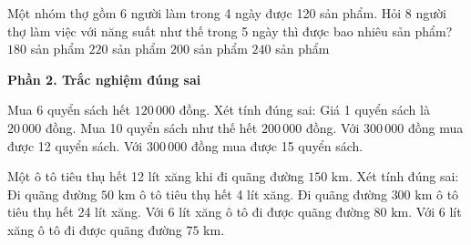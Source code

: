 \begin{ex} %
Một nhóm thợ gồm 6 người làm trong 4 ngày được 120 sản phẩm. Hỏi 8 người thợ làm việc với năng suất như thế trong 5 ngày thì được bao nhiêu sản phẩm?
\choice
{$180$ sản phẩm}
{$220$ sản phẩm}
{\True $200$ sản phẩm}
{$240$ sản phẩm}
\end{ex}

\textbf{Phần 2. Trắc nghiệm đúng sai}

\begin{ex} %
Mua 6 quyển sách hết $120\,000$ đồng. Xét tính đúng sai:
\choiceTF
{\True Giá 1 quyển sách là $20\,000$ đồng.}
{\True Mua 10 quyển sách như thế hết $200\,000$ đồng.}
{Với $300\,000$ đồng mua được 12 quyển sách.}
{\True Với $300\,000$ đồng mua được 15 quyển sách.}
\end{ex}

\begin{ex} %
Một ô tô tiêu thụ hết 12 lít xăng khi đi quãng đường $150\text{ km}$. Xét tính đúng sai:
\choiceTF
{\True Đi quãng đường $50\text{ km}$ ô tô tiêu thụ hết 4 lít xăng.}
{\True Đi quãng đường $300\text{ km}$ ô tô tiêu thụ hết 24 lít xăng.}
{Với 6 lít xăng ô tô đi được quãng đường $80\text{ km}$.}
{\True Với 6 lít xăng ô tô đi được quãng đường $75\text{ km}$.}
\end{ex}

